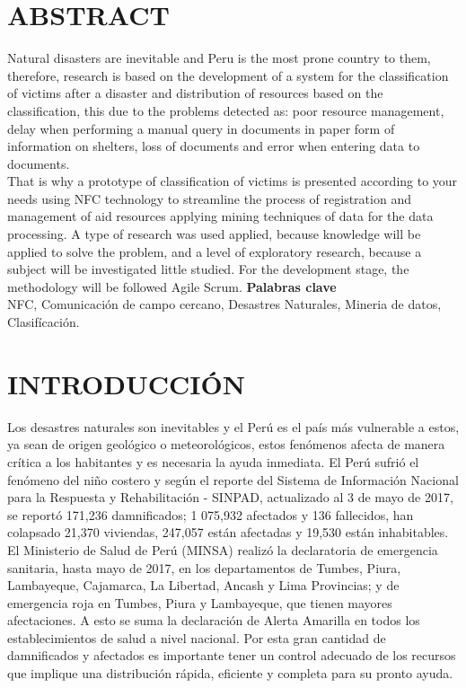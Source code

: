 \documentclass[11pt,openany]{book}
\begin{document}
	\chapter*{ABSTRACT}
	
	Natural disasters are inevitable and Peru is the most prone country
	to them, therefore, research is based on the development of a system for
	the classification of victims after a disaster and distribution of
	resources based on the classification, this due to the problems detected
	as: poor resource management, delay when performing a manual query
	in documents in paper form of information on shelters, loss of
	documents and error when entering data to documents.\\
	That is why a prototype of classification of victims is presented
	according to your needs using NFC technology to streamline the process
	of registration and management of aid resources applying mining techniques of data for the data processing. A type of research was used
	applied, because knowledge will be applied to solve the problem, and
	a level of exploratory research, because a subject will be investigated
	little studied. For the development stage, the methodology will be followed Agile Scrum.
	\newpage
	\textbf{Palabras clave}\\[0.25cm]
	NFC, Comunicación de campo cercano, Desastres Naturales, Mineria de datos, Clasifícación.

	\newpage
	\chapter*{INTRODUCCIÓN}
	
	Los desastres naturales son inevitables y el Perú es el país más vulnerable a estos, ya sean de origen geológico o meteorológicos, estos fenómenos afecta de manera crítica a los habitantes y es necesaria la ayuda inmediata. El Perú sufrió el fenómeno del niño costero y según el reporte del Sistema de Información Nacional para la Respuesta y Rehabilitación - SINPAD, actualizado al 3 de mayo de 2017, se reportó 171,236 damnificados; 1 075,932 afectados y 136 fallecidos, han colapsado 21,370 viviendas, 247,057 están afectadas y 19,530 están inhabitables. El Ministerio de Salud de Perú (MINSA) realizó la declaratoria de emergencia sanitaria, hasta mayo de 2017, en los departamentos de Tumbes, Piura, Lambayeque, Cajamarca, La Libertad, Ancash y Lima Provincias; y de emergencia roja en Tumbes, Piura y Lambayeque, que tienen mayores afectaciones. A esto se suma la declaración de Alerta Amarilla en todos los establecimientos de salud a nivel nacional. Por esta gran cantidad de damnificados y afectados es importante tener un control adecuado de los recursos que implique una distribución rápida, eficiente y completa para su pronto ayuda. \\
\end{document}
